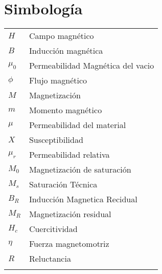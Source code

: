 \chapter{Simbolog\'ia}


\begin{tabular}{ll}
	$H$\hspace{3cm} & Campo magn\'etico \\
	$B$\hspace{3cm} & Inducci\'on magn\'etica\\
	$\mu_0$\hspace{3cm} & Permeabilidad Magn\'etica del vacio \\
	$\phi$\hspace{3cm} & Flujo magn\'etico\\
	$M$\hspace{3cm} & Magnetizaci\'on\\
	$m$\hspace{3cm} & Momento magn\'etico\\
	$\mu$\hspace{3cm} & Permeabilidad del material\\ 
	$X$\hspace{3cm} & Susceptibilidad\\
	$\mu_r$\hspace{3cm} & Permeabilidad relativa\\
	$M_0$\hspace{3cm} & Magnetizaci\'on de saturaci\'on\\
	$M_s$\hspace{3cm} & Saturaci\'on T\'ecnica\\
	$B_R$\hspace{3cm} & Inducci\'on Magnetica Recidual\\
	$M_R$\hspace{3cm} & Magnetizaci\'on residual\\
	$H_c$\hspace{3cm} & Cuercitividad\\
	$\eta$\hspace{3cm} & Fuerza magnetomotriz\\
	$R$\hspace{3cm} & Reluctancia\\
	\\
\end{tabular}

